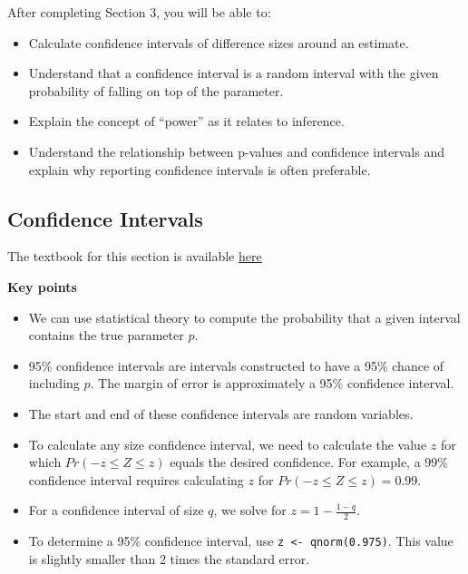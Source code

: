\documentclass[
]{article}
\providecommand{\tightlist}{%
  \setlength{\itemsep}{0pt}\setlength{\parskip}{0pt}}
\begin{document}
After completing Section 3, you will be able to:

\begin{itemize}
\tightlist
\item
  Calculate confidence intervals of difference sizes around an estimate.
\item
  Understand that a confidence interval is a random interval with the
  given probability of falling on top of the parameter.
\item
  Explain the concept of ``power'' as it relates to inference.
\item
  Understand the relationship between p-values and confidence intervals
  and explain why reporting confidence intervals is often preferable.
\end{itemize}

\hypertarget{confidence-intervals}{%
\subsection{Confidence Intervals}\label{confidence-intervals}}

The textbook for this section is available
\href{https://rafalab.github.io/dsbook/inference.html\#confidence-intervals}{here}

\textbf{Key points}

\begin{itemize}
\tightlist
\item
  We can use statistical theory to compute the probability that a given
  interval contains the true parameter \(p\).
\item
  95\% confidence intervals are intervals constructed to have a 95\%
  chance of including \(p\). The margin of error is approximately a 95\%
  confidence interval.
\item
  The start and end of these confidence intervals are random variables.
\item
  To calculate any size confidence interval, we need to calculate the
  value \(z\) for which \(Pr(-z \le Z \le z)\) equals the desired
  confidence. For example, a 99\% confidence interval requires
  calculating \(z\) for \(Pr(-z \le Z \le z) = 0.99\).
\item
  For a confidence interval of size \(q\), we solve for
  \(z = 1 - \frac{1 - q}{2}\).
\item
  To determine a 95\% confidence interval, use
  \texttt{z\ \textless{}-\ qnorm(0.975)}. This value is slightly smaller
  than 2 times the standard error.
\end{itemize}
\end{document}
